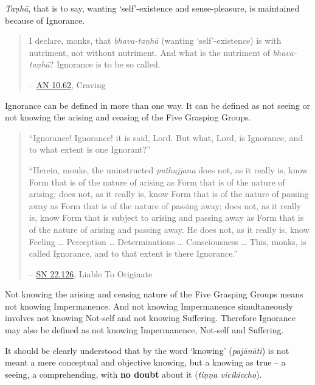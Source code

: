 \emph{Taṇhā}, that is to say, wanting `self'-existence and sense-pleasure, is maintained because of Ignorance.

\begin{quote}
I declare, monks, that \emph{bhava-taṇhā} (wanting `self'-existence) is with nutriment, not without nutriment. And what is the nutriment of \emph{bhava-taṇhā}? Ignorance is to be so called.

 -- \href{https://suttacentral.net/an10.62/en/bodhi}{AN 10.62}, Craving
\end{quote}

Ignorance can be defined in more than one way. It can be defined as not seeing or not knowing the arising and ceasing of the Five Grasping Groups.

\begin{quote}
``Ignorance! Ignorance! it is said, Lord. But what, Lord, is Ignorance, and to what extent is one Ignorant?''

``Herein, monks, the uninstructed \emph{puthujjana} does not, as it really is, know Form that is of the nature of arising as Form that is of the nature of arising; does not, as it really is, know Form that is of the nature of passing away as Form that is of the nature of passing away; does not, as it really is, know Form that is subject to arising and passing away as Form that is of the nature of arising and passing away. He does not, as it really is, know Feeling \ldots\hspace{0pt} Perception \ldots\hspace{0pt} Determinations \ldots\hspace{0pt} Consciousness \ldots\hspace{0pt} This, monks, is called Ignorance, and to that extent is there Ignorance.''

 -- \href{https://suttacentral.net/sn22.126/en/sujato}{SN 22.126}, Liable To Originate
\end{quote}

Not knowing the arising and ceasing nature of the Five Grasping Groups means not knowing Impermanence. And not knowing Impermanence simultaneously involves not knowing Not-self and not knowing Suffering. Therefore Ignorance may also be defined as not knowing Impermanence, Not-self and Suffering.

It should be clearly understood that by the word `knowing' (\emph{pajānāti}) is not meant a mere conceptual and objective knowing, but a knowing as true -- a seeing, a comprehending, with \textbf{no doubt} about it (\emph{tiṇṇa vicikiccho}).

